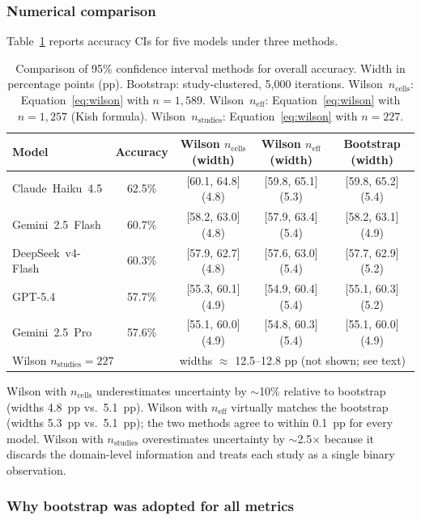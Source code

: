 \documentclass[../main.tex]{subfiles}
\begin{document}
\subsubsection*{Numerical comparison}

Table~\ref{tab:ci-comparison} reports accuracy CIs for five models under three
methods.

\begin{table}[ht]
\centering
\caption{Comparison of 95\% confidence interval methods for overall accuracy.
Width in percentage points (pp).
Bootstrap: study-clustered, 5{,}000 iterations.
Wilson~$n_{\text{cells}}$: Equation~\eqref{eq:wilson} with $n = 1{,}589$.
Wilson~$n_{\text{eff}}$: Equation~\eqref{eq:wilson} with $n = 1{,}257$ (Kish formula).
Wilson~$n_{\text{studies}}$: Equation~\eqref{eq:wilson} with $n = 227$.}
\label{tab:ci-comparison}
\begin{tabular}{lcccc}
\toprule
Model & Accuracy & Wilson $n_{\text{cells}}$ (width) & Wilson $n_{\text{eff}}$ (width) & Bootstrap (width) \\
\midrule
Claude~Haiku~4.5  & 62.5\% & [60.1, 64.8] (4.8) & [59.8, 65.1] (5.3) & [59.8, 65.2] (5.4) \\
Gemini~2.5~Flash  & 60.7\% & [58.2, 63.0] (4.8) & [57.9, 63.4] (5.4) & [58.2, 63.1] (4.9) \\
DeepSeek~v4-Flash & 60.3\% & [57.9, 62.7] (4.8) & [57.6, 63.0] (5.4) & [57.7, 62.9] (5.2) \\
GPT-5.4           & 57.7\% & [55.3, 60.1] (4.9) & [54.9, 60.4] (5.4) & [55.1, 60.3] (5.2) \\
Gemini~2.5~Pro    & 57.6\% & [55.1, 60.0] (4.9) & [54.8, 60.3] (5.4) & [55.1, 60.0] (4.9) \\
\midrule
\multicolumn{2}{l}{Wilson $n_{\text{studies}} = 227$} & \multicolumn{3}{l}{widths $\approx$ 12.5--12.8 pp (not shown; see text)} \\
\bottomrule
\end{tabular}
\end{table}

Wilson with $n_{\text{cells}}$ underestimates uncertainty by $\sim$10\% relative
to bootstrap (widths 4.8~pp vs.\ 5.1~pp).
Wilson with $n_{\text{eff}}$ virtually matches the bootstrap (widths 5.3~pp
vs.\ 5.1~pp); the two methods agree to within 0.1~pp for every model.
Wilson with $n_{\text{studies}}$ overestimates uncertainty by $\sim$2.5$\times$
because it discards the domain-level information and treats each study as a
single binary observation.

\subsubsection*{Why bootstrap was adopted for all metrics}
\end{document}
